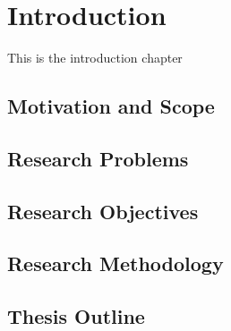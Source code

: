 \chapter{Introduction}

    This is the introduction chapter

    \section{Motivation and Scope}

    \section{Research Problems}
    \section{Research Objectives}
    \section{Research Methodology}
    \section{Thesis Outline}



